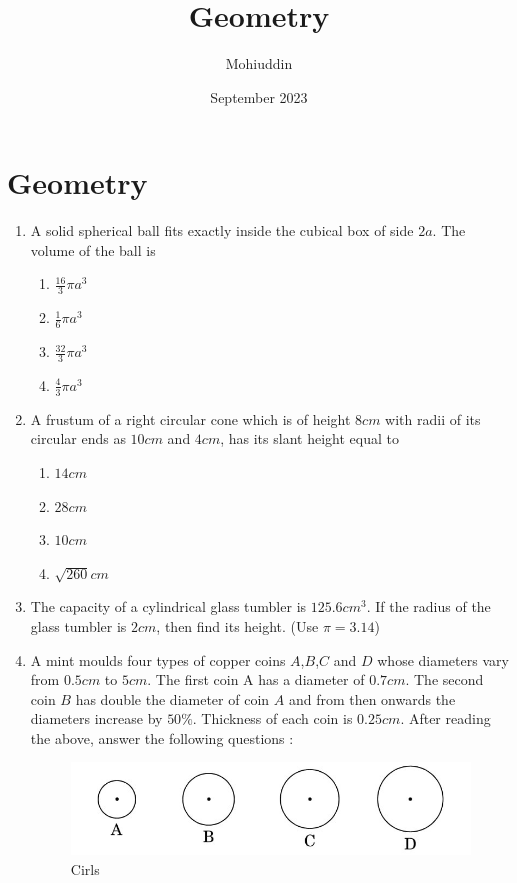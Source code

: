 \documentclass{article}
\title{Geometry}
\author{Mohiuddin}
\date{September 2023}
\begin{document}
\maketitle

\section{Geometry}
\begin{enumerate}
    \item A solid spherical ball fits exactly inside the cubical box of side $2a$. The volume of the ball is 
\begin{enumerate}
    \item $\frac{16}{3}\pi a^3$
    \item $\frac{1}{6}\pi a^3$
    \item $\frac{32}{3}\pi a^3$
        \item $\frac{4}{3}\pi a^3$
    \end{enumerate}
    
    \item A frustum of a right circular cone which is of height $8 cm$ with radii of its circular ends as $10 cm$ and $4 cm$, has its slant height equal to 
\begin{enumerate}
    \item $ 14 cm$
    \item $28 cm$
    \item $10 cm$
    \item $\sqrt{260}cm$
    \end{enumerate}
    
    \item The capacity of a cylindrical glass tumbler is $125.6 cm^3$. If the radius of the glass tumbler is $2 cm$, then find its height. (Use $\pi= 3.14$)
\newpage
\item A mint moulds four types of copper coins $A$,$B$,$C$ and $D$ whose diameters vary from $0.5 cm$ to $5 cm$. The first coin A has a diameter of $0.7 cm$. The second coin $B$ has double the diameter of coin $A$ and from then onwards the diameters increase by $50\%$. Thickness of each coin is $0.25 cm$.
    After reading the above, answer the following questions :
\begin{figure}[H]
    \centering
    \includegraphics[width=\columnwidth]{figs/cirls.png}
    \caption{Cirls}
    \label{fig:copper coins}
    \end{figure}
      

\end{enumerate}
\end{document}
